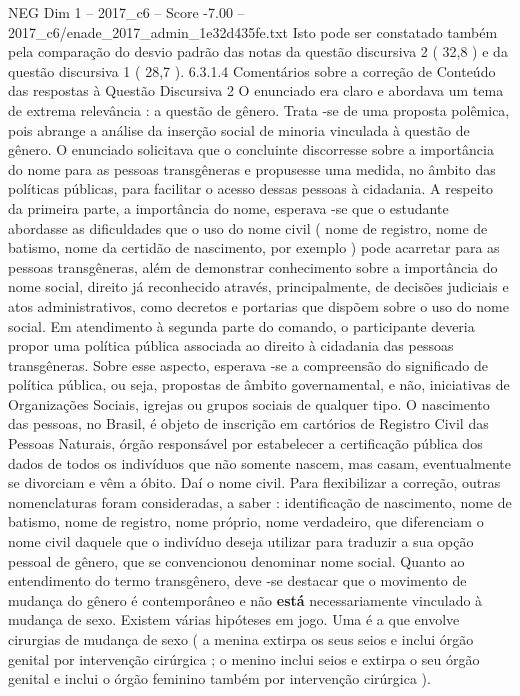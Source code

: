 \begin{textsample}{NEG Dim 1 – 2017\_c6 – Score -7.00 – 2017\_c6/enade\_2017\_admin\_1e32d435fe.txt}
Isto pode ser constatado também pela comparação do desvio padrão das notas da questão discursiva 2 ( 32,8 ) e da questão discursiva 1 ( 28,7 ). 6.3.1.4 Comentários sobre a correção de Conteúdo das respostas à Questão Discursiva 2 O enunciado era claro e abordava um tema de extrema relevância : a questão de gênero.
Trata -se de uma proposta polêmica, pois abrange a análise da inserção social de minoria vinculada à questão de gênero.
O enunciado solicitava que o concluinte discorresse sobre a importância do nome para as pessoas transgêneras e propusesse uma medida, no âmbito das políticas públicas, para facilitar o acesso dessas pessoas à cidadania.
A respeito da primeira parte, a importância do nome, esperava -se que o estudante abordasse as dificuldades que o uso do nome civil ( nome de registro, nome de batismo, nome da certidão de nascimento, por exemplo ) pode acarretar para as pessoas transgêneras, além de demonstrar conhecimento sobre a importância do nome social, direito já reconhecido através, principalmente, de decisões judiciais e atos administrativos, como decretos e portarias que dispõem sobre o uso do nome social.
Em atendimento à segunda parte do comando, o participante deveria propor uma política pública associada ao direito à cidadania das pessoas transgêneras.
Sobre esse aspecto, esperava -se a compreensão do significado de política pública, ou seja, propostas de âmbito governamental, e não, iniciativas de Organizações Sociais, igrejas ou grupos sociais de qualquer tipo.
O nascimento das pessoas, no Brasil, é objeto de inscrição em cartórios de Registro Civil das Pessoas Naturais, órgão responsável por estabelecer a certificação pública dos dados de todos os indivíduos que não somente nascem, mas casam, eventualmente se divorciam e vêm a óbito.
Daí o nome civil.
Para flexibilizar a correção, outras nomenclaturas foram consideradas, a saber : identificação de nascimento, nome de batismo, nome de registro, nome próprio, nome verdadeiro, que diferenciam o nome civil daquele que o indivíduo deseja utilizar para traduzir a sua opção pessoal de gênero, que se convencionou denominar nome social.
Quanto ao entendimento do termo transgênero, deve -se destacar que o movimento de mudança do gênero é contemporâneo e não \textbf{está} necessariamente vinculado à mudança de sexo.
Existem várias hipóteses em jogo.
Uma é a que envolve cirurgias de mudança de sexo ( a menina extirpa os seus seios e inclui órgão genital por intervenção cirúrgica ; o menino inclui seios e extirpa o seu órgão genital e inclui o órgão feminino também por intervenção cirúrgica ).

\end{textsample}
